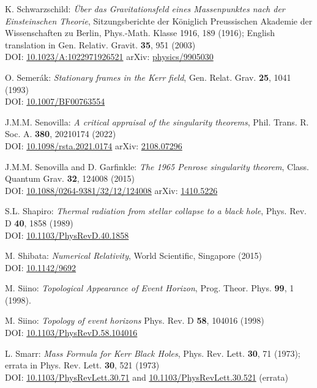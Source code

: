 \begin{thebibliography}{123}
K. Schwarzschild:
{\em \"Uber das Gravitationsfeld eines Massenpunktes nach der Einsteinschen Theorie},
Sitzungsberichte der K\"oniglich Preussischen Akademie der Wissenschaften zu Berlin, Phys.-Math. Klasse 1916, 189 (1916);
English translation in Gen. Relativ. Gravit. {\bf 35}, 951 (2003)\\
DOI: \href{https://doi.org/10.1023/A:1022971926521}{10.1023/A:1022971926521}\hfill
arXiv: \href{https://arxiv.org/abs/physics/9905030}{physics/9905030}

O. Semer\'ak:
{\em Stationary frames in the Kerr field},
Gen. Relat. Grav. {\bf 25}, 1041 (1993)\\
DOI: \href{https://doi.org/10.1007/BF00763554}{10.1007/BF00763554}

J.M.M. Senovilla:
{\em A critical appraisal of the singularity theorems},
Phil. Trans. R. Soc. A. {\bf 380}, 20210174 (2022)\\
DOI: \href{https://doi.org/10.1098/rsta.2021.0174}{10.1098/rsta.2021.0174}\hfill
arXiv: \href{https://arxiv.org/abs/2108.07296}{2108.07296}

J.M.M. Senovilla and D. Garfinkle:
{\em The 1965 Penrose singularity theorem},
Class. Quantum Grav. {\bf 32}, 124008 (2015)\\
DOI: \href{https://doi.org/10.1088/0264-9381/32/12/124008}{10.1088/0264-9381/32/12/124008}\hfill
arXiv: \href{https://arxiv.org/abs/1410.5226}{1410.5226}

S.L. Shapiro:
{\em Thermal radiation from stellar collapse to a black hole},
Phys. Rev. D {\bf 40}, 1858 (1989)\\
DOI: \href{https://doi.org/10.1103/PhysRevD.40.1858}{10.1103/PhysRevD.40.1858}

M. Shibata:
{\em Numerical Relativity},
World Scientific, Singapore (2015)\\
DOI: \href{https://doi.org/10.1142/9692}{10.1142/9692}

M. Siino: {\em Topological Appearance of Event Horizon},
Prog. Theor. Phys. {\bf 99}, 1 (1998).

M. Siino: {\em Topology of event horizons}
Phys. Rev. D {\bf 58}, 104016 (1998)\\
DOI: \href{https://doi.org/10.1103/PhysRevD.58.104016}{10.1103/PhysRevD.58.104016}

L. Smarr: {\em Mass Formula for Kerr Black Holes},
Phys. Rev. Lett. {\bf 30}, 71 (1973); errata in Phys. Rev. Lett. {\bf 30}, 521 (1973)\\
DOI: \href{https://doi.org/10.1103/PhysRevLett.30.71}{10.1103/PhysRevLett.30.71}
and
\href{https://doi.org/10.1103/PhysRevLett.30.521}{10.1103/PhysRevLett.30.521} (errata)


\end{thebibliography}
